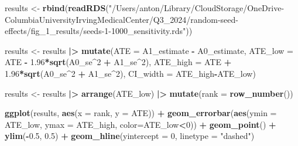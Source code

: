 \documentclass[
]{article}
\newenvironment{Shaded}{\begin{snugshade}}{\end{snugshade}}
\newcommand{\AttributeTok}[1]{\textcolor[rgb]{0.13,0.29,0.53}{#1}}
\newcommand{\DecValTok}[1]{\textcolor[rgb]{0.00,0.00,0.81}{#1}}
\newcommand{\FloatTok}[1]{\textcolor[rgb]{0.00,0.00,0.81}{#1}}
\newcommand{\FunctionTok}[1]{\textcolor[rgb]{0.13,0.29,0.53}{\textbf{#1}}}
\newcommand{\NormalTok}[1]{#1}
\newcommand{\OtherTok}[1]{\textcolor[rgb]{0.56,0.35,0.01}{#1}}
\newcommand{\SpecialCharTok}[1]{\textcolor[rgb]{0.81,0.36,0.00}{\textbf{#1}}}
\newcommand{\StringTok}[1]{\textcolor[rgb]{0.31,0.60,0.02}{#1}}
\begin{document}
\begin{Shaded}
\begin{Highlighting}[]
\NormalTok{results }\OtherTok{\textless{}{-}} \FunctionTok{rbind}\NormalTok{(}\FunctionTok{readRDS}\NormalTok{(}\StringTok{"/Users/anton/Library/CloudStorage/OneDrive{-}ColumbiaUniversityIrvingMedicalCenter/Q3\_2024/random{-}seed{-}effects/fig\_1\_results/seeds{-}1{-}1000\_sensitivity.rds"}\NormalTok{))}

\NormalTok{results }\OtherTok{\textless{}{-}}\NormalTok{ results }\SpecialCharTok{|\textgreater{}} 
  \FunctionTok{mutate}\NormalTok{(}\AttributeTok{ATE =}\NormalTok{ A1\_estimate }\SpecialCharTok{{-}}\NormalTok{ A0\_estimate,}
         \AttributeTok{ATE\_low =}\NormalTok{ ATE }\SpecialCharTok{{-}} \FloatTok{1.96}\SpecialCharTok{*}\FunctionTok{sqrt}\NormalTok{(A0\_se}\SpecialCharTok{\^{}}\DecValTok{2} \SpecialCharTok{+}\NormalTok{ A1\_se}\SpecialCharTok{\^{}}\DecValTok{2}\NormalTok{),}
         \AttributeTok{ATE\_high =}\NormalTok{ ATE }\SpecialCharTok{+} \FloatTok{1.96}\SpecialCharTok{*}\FunctionTok{sqrt}\NormalTok{(A0\_se}\SpecialCharTok{\^{}}\DecValTok{2} \SpecialCharTok{+}\NormalTok{ A1\_se}\SpecialCharTok{\^{}}\DecValTok{2}\NormalTok{),}
         \AttributeTok{CI\_width =}\NormalTok{ ATE\_high}\SpecialCharTok{{-}}\NormalTok{ATE\_low)}

\NormalTok{results }\OtherTok{\textless{}{-}}\NormalTok{ results }\SpecialCharTok{|\textgreater{}}
  \FunctionTok{arrange}\NormalTok{(ATE\_low) }\SpecialCharTok{|\textgreater{}}
  \FunctionTok{mutate}\NormalTok{(}\AttributeTok{rank =} \FunctionTok{row\_number}\NormalTok{())}

\FunctionTok{ggplot}\NormalTok{(results, }\FunctionTok{aes}\NormalTok{(}\AttributeTok{x =}\NormalTok{ rank, }\AttributeTok{y =}\NormalTok{ ATE)) }\SpecialCharTok{+}
  \FunctionTok{geom\_errorbar}\NormalTok{(}\FunctionTok{aes}\NormalTok{(}\AttributeTok{ymin =}\NormalTok{ ATE\_low, }\AttributeTok{ymax =}\NormalTok{ ATE\_high, }\AttributeTok{color=}\NormalTok{ATE\_low}\SpecialCharTok{\textless{}}\DecValTok{0}\NormalTok{)) }\SpecialCharTok{+}
  \FunctionTok{geom\_point}\NormalTok{() }\SpecialCharTok{+} 
  \FunctionTok{ylim}\NormalTok{(}\SpecialCharTok{{-}}\FloatTok{0.5}\NormalTok{, }\FloatTok{0.5}\NormalTok{) }\SpecialCharTok{+}
  \FunctionTok{geom\_hline}\NormalTok{(}\AttributeTok{yintercept =} \DecValTok{0}\NormalTok{, }\AttributeTok{linetype =} \StringTok{"dashed"}\NormalTok{)}
\end{Highlighting}
\end{Shaded}
\end{document}
